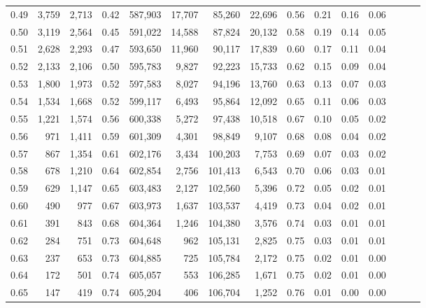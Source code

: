 \begin{tabular}{rrrrrrrrrrrrrrr}
0.49 &   3,759 &  2,713 &  0.42 &  587,903 &   17,707 &   85,260 &   22,696 &  0.56 &  0.21 &  0.16 &      0.06 \\
0.50 &   3,119 &  2,564 &  0.45 &  591,022 &   14,588 &   87,824 &   20,132 &  0.58 &  0.19 &  0.14 &      0.05 \\
0.51 &   2,628 &  2,293 &  0.47 &  593,650 &   11,960 &   90,117 &   17,839 &  0.60 &  0.17 &  0.11 &      0.04 \\
0.52 &   2,133 &  2,106 &  0.50 &  595,783 &    9,827 &   92,223 &   15,733 &  0.62 &  0.15 &  0.09 &      0.04 \\
0.53 &   1,800 &  1,973 &  0.52 &  597,583 &    8,027 &   94,196 &   13,760 &  0.63 &  0.13 &  0.07 &      0.03 \\
0.54 &   1,534 &  1,668 &  0.52 &  599,117 &    6,493 &   95,864 &   12,092 &  0.65 &  0.11 &  0.06 &      0.03 \\
0.55 &   1,221 &  1,574 &  0.56 &  600,338 &    5,272 &   97,438 &   10,518 &  0.67 &  0.10 &  0.05 &      0.02 \\
0.56 &     971 &  1,411 &  0.59 &  601,309 &    4,301 &   98,849 &    9,107 &  0.68 &  0.08 &  0.04 &      0.02 \\
0.57 &     867 &  1,354 &  0.61 &  602,176 &    3,434 &  100,203 &    7,753 &  0.69 &  0.07 &  0.03 &      0.02 \\
0.58 &     678 &  1,210 &  0.64 &  602,854 &    2,756 &  101,413 &    6,543 &  0.70 &  0.06 &  0.03 &      0.01 \\
0.59 &     629 &  1,147 &  0.65 &  603,483 &    2,127 &  102,560 &    5,396 &  0.72 &  0.05 &  0.02 &      0.01 \\
0.60 &     490 &    977 &  0.67 &  603,973 &    1,637 &  103,537 &    4,419 &  0.73 &  0.04 &  0.02 &      0.01 \\
0.61 &     391 &    843 &  0.68 &  604,364 &    1,246 &  104,380 &    3,576 &  0.74 &  0.03 &  0.01 &      0.01 \\
0.62 &     284 &    751 &  0.73 &  604,648 &      962 &  105,131 &    2,825 &  0.75 &  0.03 &  0.01 &      0.01 \\
0.63 &     237 &    653 &  0.73 &  604,885 &      725 &  105,784 &    2,172 &  0.75 &  0.02 &  0.01 &      0.00 \\
0.64 &     172 &    501 &  0.74 &  605,057 &      553 &  106,285 &    1,671 &  0.75 &  0.02 &  0.01 &      0.00 \\
0.65 &     147 &    419 &  0.74 &  605,204 &      406 &  106,704 &    1,252 &  0.76 &  0.01 &  0.00 &      0.00 \\

\end{tabular}
